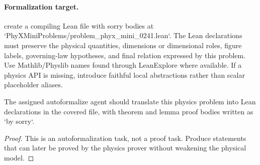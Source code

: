 \paragraph{Formalization target.}
create a compiling Lean file with sorry bodies at `PhyXMiniProblems/problem\_phyx\_mini\_0241.lean`. The Lean declarations must preserve the physical quantities, dimensions or dimensional roles, figure labels, governing-law hypotheses, and final relation expressed by this problem.
Use Mathlib/Physlib names found through LeanExplore where available. If a physics API is missing, introduce faithful local abstractions rather than scalar placeholder aliases.

\begin{theorem}
\label{thm:physics:phyx_mini_0241:target}
The assigned autoformalize agent should translate this physics problem into Lean declarations in the covered file, with theorem and lemma proof bodies written as `by sorry`.
\end{theorem}
\begin{proof}
This is an autoformalization task, not a proof task. Produce statements that can later be proved by the physics prover without weakening the physical model.
\end{proof}

